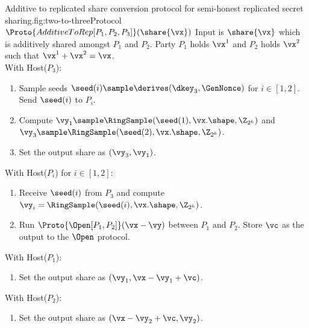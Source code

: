 
\begin{Boxfig}{Additive to replicated share conversion protocol for semi-honest
replicated secret sharing.}{fig:two-to-three}{Protocol $\Proto{AdditiveToRep[P_1, P_2, P_3]}(\share{\vx})$}
Input is $\share{\vx}$ which is additively shared amongst $P_1$ and $P_2$.
Party $P_1$ holds $\vx^1$ and $P_2$ holds $\vx^2$ such that $\vx^1 + \vx^2 = \vx$. \\
With Host($P_3$):
\begin{enumerate}
  \item Sample seeds $\seed(i) \sample \derives(\dkey_3, \GenNonce)$ for $i \in [1, 2]$. Send $\seed(i)$ to $P_i$.
  \item Compute $\vy_1 \sample \RingSample(\seed(1), \vx.\shape, \Z_{2^k})$
  and $\vy_3 \sample \RingSample(\seed(2), \vx.\shape, \Z_{2^k})$.
  \item Set
  the output share as $(\vy_3, \vy_1)$.
\end{enumerate}

With Host($P_i$) for $i \in [1,2]$:
\begin{enumerate}
   \item Receive $\seed(i)$ from $P_3$ and compute $\vy_i = \RingSample(\seed(i), \vx.\shape, \Z_{2^k})$.
   \item Run $\Proto{\Open[P_1, P_2]}(\vx - \vy)$ between $P_1$ and $P_2$. Store $\vc$ as the output
   to the $\Open$ protocol.
\end{enumerate}

With Host($P_1$):
\begin{enumerate}
  \item Set the output share as $(\vy_1, \vx - \vy_1 + \vc)$.
\end{enumerate}
With Host($P_2$):
\begin{enumerate}
  \item Set the output share as $(\vx - \vy_2 + \vc, \vy_2)$.
\end{enumerate}
\end{Boxfig}

